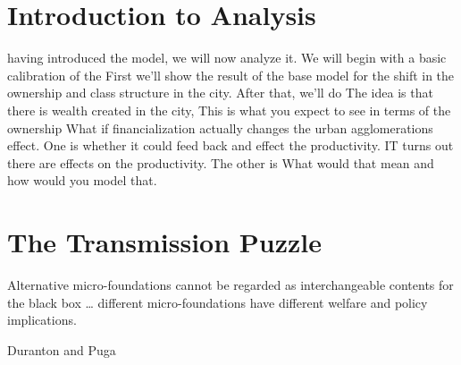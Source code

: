 \chapter{Introduction to Analysis}
{\color{red} having introduced the model, we will now analyze it. We will begin with a basic calibration of the 
First we'll show the result of the base model for the shift in the ownership and class structure in the city. After that, we'll do 
The idea is that there is wealth created in the city, 
This is what you expect to see in terms of the ownership
What if financialization actually changes the urban agglomerations effect.
One is whether it could feed back and effect the productivity.
IT turns out there are effects on the productivity. 
The other is 
What would that mean and how would you model that. }
\chapter{The Transmission Puzzle} \label{chapter-tramsmission}%

\epigraph{Alternative micro-foundations cannot be regarded as interchangeable contents for the black box \dots %
different micro-foundations have different welfare and policy implications. %
}{Duranton and Puga \cite{durantonMicroFoundationsUrbanAgglomeration2004}}

